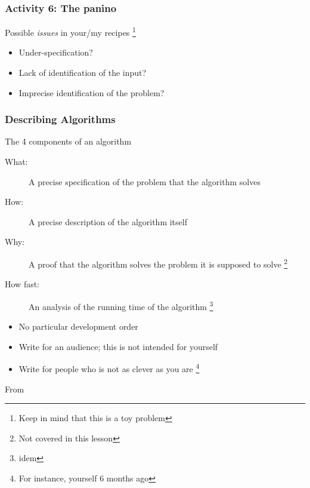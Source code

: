 \documentclass[xcolor=x11names,handout]{beamer}
\begin{document}
\begin{frame}
\frametitle{Activity 6: The panino}

Possible \textit{issues} in \alert{your/my} recipes%
\footnote{Keep in mind that this is a toy problem}
\bigskip 

\begin{itemize}
 \item Under-specification?						\bigskip	\pause 
 \item Lack of identification of the input?		\bigskip	\pause 
 \item Imprecise identification of the problem?
\end{itemize}
\end{frame}

\begin{frame}
\frametitle{Describing Algorithms}

The 4 components of an algorithm

\begin{description}
 \item[What:] A precise specification of the problem that the algorithm solves
	\pause 
 \item[How:] A precise description of the algorithm itself			\pause 
 \item[Why:] A proof that the algorithm solves the problem it is supposed to 
solve%
\footnote{Not covered in this lesson}			\pause 
 \item[How fast:] An analysis of the running time of the algorithm%
\footnote{idem}
\end{description}	\pause 

\begin{itemize}
 \item No particular development order				\pause 
 \item Write for an audience; this is not intended for yourself \pause 
 \item Write for people who is not as clever as you are%
\footnote{For instance, yourself 6 months ago}
\end{itemize}

\onslide 
From~\cite[p. 11]{Erickson:19}
\end{frame}
\end{document}
